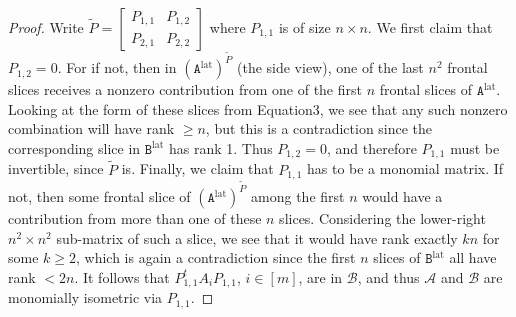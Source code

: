 \begin{proof}
Write $\widetilde P=\begin{bmatrix}P_{1,1}&P_{1,2}\\P_{2,1}&P_{2,2}\end{bmatrix}$ where $P_{1,1}$ is of size $n\times n$. We first claim that $P_{1,2}=0$. For if not, then in $(\mathtt A^{\mathrm{lat}})^{\widetilde P}$ (the side view), one of the last $n^2$ frontal slices receives a nonzero contribution from one of the first $n$ frontal slices of $\mathtt A^{\mathrm{lat}}$. Looking at the form of these slices from Equation3, we see that any such nonzero combination will have rank $\ge n$, but this is a contradiction since the corresponding slice in $\mathtt B^{\mathrm{lat}}$ has rank 1. Thus $P_{1,2}=0$, and therefore $P_{1,1}$ must be invertible, since $\widetilde P$ is.
Finally, we claim that $P_{1,1}$ has to be a monomial matrix. If not, then some frontal slice of $(\mathtt A^{\mathrm{lat}})^{\widetilde P}$ among the first $n$ would have a contribution from more than one of these $n$ slices. Considering the lower-right $n^2\times n^2$ sub-matrix of such a slice, we see that it would have rank exactly $kn$ for some $k\ge2$, which is again a contradiction since the first $n$ slices of $\mathtt B^{\mathrm{lat}}$ all have rank $<2n$. It follows that $P_{1,1}^tA_iP_{1,1}$, $i\in[m]$, are in $\mathcal B$, and thus $\mathcal A$ and $\mathcal B$ are monomially isometric via $P_{1,1}$.
\end{proof}
